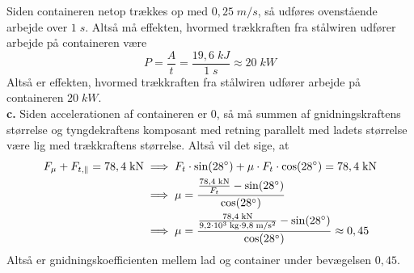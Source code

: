 \documentclass{report}
\begin{document}
Siden containeren netop trækkes op med $0,25 \;\unit{m/s} $, så udføres ovenstående arbejde over $1 \;\unit{s} $.
Altså må effekten, hvormed trækkraften fra stålwiren udfører arbejde på containeren være
\[
P=\frac{A}{t}= \frac{19,6 \;\unit{kJ}}{1 \;\unit{s} }\approx20 \;\unit{kW} 
\] 
Altså er effekten, hvormed trækkraften fra stålwiren udfører arbejde på containeren $20 \;\unit{kW} $. \\[1ex]
\textbf{c.} Siden accelerationen af containeren er $0$, så må summen af gnidningskraftens størrelse og tyngdekraftens komposant med retning parallelt med ladets størrelse være lig med trækkraftens størrelse.
Altså vil det sige, at
\begin{equation*}
\begin{split}
  F_{\mu} + F_{t,\parallel}=78,4 \;\unit{kN}&\implies F_t \cdot \sin(28\degree) + \mu \cdot F_t \cdot \cos(28 \degree )=78,4 \;\unit{kN} \\ 
  &\implies \mu=\frac{\frac{78,4 \;\unit{kN} }{F_t}-\sin(28 \degree )}{\cos(28 \degree )} \\ 
  &\implies \mu=\frac{\frac{78,4 \;\unit{kN} }{9,2\cdot 10^3 \;\unit{kg} \cdot 9,8 \;\unit{m/s^2} }-\sin(28 \degree )}{\cos(28 \degree )} \approx 0,45
\end{split}
\end{equation*}
Altså er gnidningskoefficienten mellem lad og container under bevægelsen $0,45$.
\end{document}
